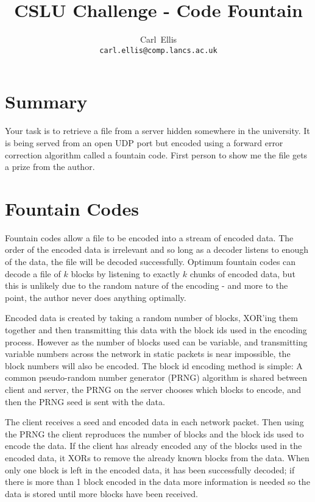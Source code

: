 \documentclass[10pt,a4paper]{article}
\begin{document}
\title{CSLU Challenge - Code Fountain}

\author{Carl~Ellis \\ \texttt{carl.ellis@comp.lancs.ac.uk} }

\maketitle

\section{Summary}

Your task is to retrieve a file from a server hidden somewhere in the university.
It is being served from an open UDP port but encoded using a forward error correction algorithm called a fountain code.
First person to show me the file gets a prize from the author.

\section{Fountain Codes}

Fountain codes allow a file to be encoded into a stream of encoded data.
The order of the encoded data is irrelevant and so long as a decoder listens to enough of the data, the file will be decoded successfully.
Optimum fountain codes can decode a file of $k$ blocks by listening to exactly $k$ chunks of encoded data, but this is unlikely due to the random nature of the encoding - and more to the point, the author never does anything optimally.

Encoded data is created by taking a random number of blocks, XOR'ing them together and then transmitting this data with the block ids used in the encoding process.
However as the number of blocks used can be variable, and transmitting variable numbers across the network in static packets is near impossible, the block numbers will also be encoded.
The block id encoding method is simple: A common pseudo-random number generator (PRNG) algorithm is shared between client and server, the PRNG on the server chooses which blocks to encode, and then the PRNG seed is sent with the data.

The client receives a seed and encoded data in each network packet.
Then using the PRNG the client reproduces the number of blocks and the block ids used to encode the data.
If the client has already encoded any of the blocks used in the encoded data, it XORs to remove the already known blocks from the data.
When only one block is left in the encoded data, it has been successfully decoded; if there is more than 1 block encoded in the data more information is needed so the data is stored until more blocks have been received.
\end{document}
